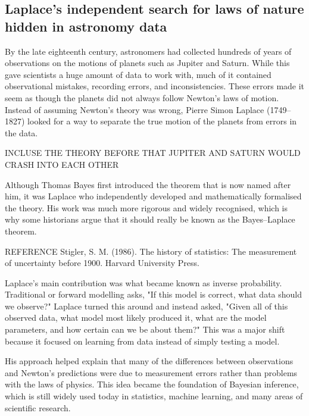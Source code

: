 

\subsection{Laplace's independent search for laws of nature hidden in astronomy data}
By the late eighteenth century, astronomers had collected hundreds of years of observations on the motions of planets such as Jupiter and Saturn. While this gave scientists a huge amount of data to work with, much of it contained observational mistakes, recording errors, and inconsistencies. These errors made it seem as though the planets did not always follow Newton's laws of motion. Instead of assuming Newton's theory was wrong, Pierre Simon Laplace (1749–1827) looked for a way to separate the true motion of the planets from errors in the data.

INCLUSE THE THEORY BEFORE THAT JUPITER AND SATURN WOULD CRASH INTO EACH OTHER

Although Thomas Bayes first introduced the theorem that is now named after him, it was Laplace who independently developed and mathematically formalised the theory. His work was much more rigorous and widely recognised, which is why some historians argue that it should really be known as the Bayes–Laplace theorem.

REFERENCE 
Stigler, S. M. (1986). The history of statistics: The measurement of uncertainty before 1900. Harvard University Press.

Laplace's main contribution was what became known as inverse probability. Traditional or forward modelling asks, "If this model is correct, what data should we observe?" Laplace turned this around and instead asked, "Given all of this observed data, what model most likely produced it, what are the model parameters, and how certain can we be about them?" This was a major shift because it focused on learning from data instead of simply testing a model.



His approach helped explain that many of the differences between observations and Newton's predictions were due to measurement errors rather than problems with the laws of physics. This idea became the foundation of Bayesian inference, which is still widely used today in statistics, machine learning, and many areas of scientific research.


